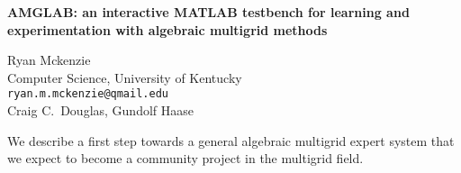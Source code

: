 \documentclass[twosided]{report}
\begin{document}
\begin{center}
{\large			%
{\bf AMGLAB: an interactive MATLAB testbench for learning and \\
	experimentation with algebraic multigrid methods}}

	Ryan Mckenzie \\
	Computer Science, University of Kentucky \\
	{\tt ryan.m.mckenzie@qmail.edu} \\
	Craig C.~Douglas, Gundolf Haase
\end{center}
We describe a first step towards a general algebraic
multigrid expert system that we expect to become a community
project in the multigrid field.



% 
% 
% 
\end{document}
